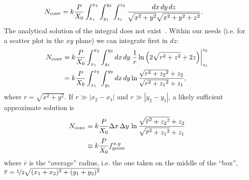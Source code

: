 \begin{description}
\begin{equation}
\begin{split}
N_{\rm conv} & = k
\frac{P}{X_0} \int_{x_1}^{x_2} \int_{y_1}^{y_2} \int_{z_1}^{z_2}  \frac{dx\,
  dy \, dz}{\sqrt{x^2+y^2}\sqrt{x^2+y^2+z^2}}. 
\end{split}
\label{eq:14}
\end{equation}
The analytical solution of the integral does not exist~\cite{integrals}. Within
our needs (i.e. for a scatter plot in the $xy$ plane) we can integrate first in $dz$:
\begin{equation}
\begin{split}
N_{\rm conv} & = k
\frac{P}{X_0} \int_{x_1}^{x_2} \int_{y_1}^{y_2} dx \, dy \left. \frac{1}{r} \ln \left( 2\sqrt{r^2+z^2} + 2z \right) \right|_{z_1}^{z_2} \\
& = k \frac{P}{X_0} \int_{x_1}^{x_2} \int_{y_1}^{y_2} dx \, dy  \ln \frac{\sqrt{r^2+{z_2}^2} + z_2}{\sqrt{r^2+{z_1}^2} + z_1} ,
\end{split}
\label{eq:15}
\end{equation}
where $r=\sqrt{x^2+y^2}$. If $r\gg |x_2-x_1|$ and $r\gg |y_2
- y_1|$, a likely sufficient approximate
solution is
\begin{equation}
\begin{split}
N_{\rm conv} & = k
\frac{P}{X_0} \Delta x\, \Delta y\,  \ln \frac{\sqrt{\overline{r}^2+{z_2}^2} + z_2}{\sqrt{\overline{r}^2+{z_1}^2} + z_1} \\
& \equiv k \frac{P}{X_0} f^{x, y}_{\rm geom}
\end{split}
\label{eq:15}
\end{equation}
where $\overline{r}$ is the ``average'' radius, i.e. the one taken on
the middle of the ``box'', $\overline{r}=\nicefrac{1}{2}\sqrt{(x_1+x_2)^2+(y_1+y_2)^2}$
\end{description}

%










  